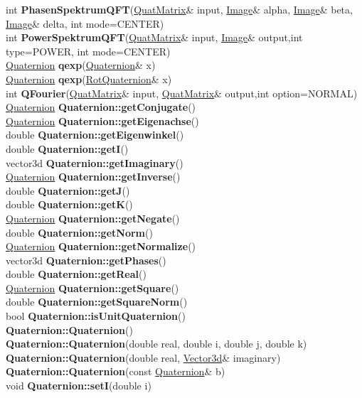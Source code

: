 \documentclass[10pt,titlepage]{article}
\def\functionlistentry#1#2#3#4#5#6{\noindent #1 {\bf #2}(#3) \dotfill #6\\}
\begin{document}
{{\functionlistentry{int}{PhasenSpektrumQFT}{\hyperlink{QuatMatrix}{QuatMatrix}\& input, \hyperlink{Image}{Image}\& alpha, \hyperlink{Image}{Image}\& beta, \hyperlink{Image}{Image}\& delta, int mode=CENTER}{1544}{quaternions}{}
\functionlistentry{int}{PowerSpektrumQFT}{\hyperlink{QuatMatrix}{QuatMatrix}\& input, \hyperlink{Image}{Image}\& output,int type=POWER, int mode=CENTER}{1541}{quaternions}{}
\functionlistentry{\hyperlink{Quaternion}{Quaternion}}{qexp}{\hyperlink{Quaternion}{Quaternion}\& x}{1477}{quaternions}{}
\functionlistentry{\hyperlink{Quaternion}{Quaternion}}{qexp}{\hyperlink{RotQuaternion}{RotQuaternion}\& x}{1501}{quaternions}{}
\functionlistentry{int}{QFourier}{\hyperlink{QuatMatrix}{QuatMatrix}\& input, \hyperlink{QuatMatrix}{QuatMatrix}\& output,int option=NORMAL}{1540}{quaternions}{}
\functionlistentry{\hyperlink{Quaternion}{Quaternion}}{Quaternion::getConjugate}{}{1467}{quaternions}{}
\functionlistentry{\hyperlink{Quaternion}{Quaternion}}{Quaternion::getEigenachse}{}{1474}{quaternions}{}
\functionlistentry{double}{Quaternion::getEigenwinkel}{}{1473}{quaternions}{}
\functionlistentry{double}{Quaternion::getI}{}{1457}{quaternions}{}
\functionlistentry{vector3d}{Quaternion::getImaginary}{}{1460}{quaternions}{}
\functionlistentry{\hyperlink{Quaternion}{Quaternion}}{Quaternion::getInverse}{}{1468}{quaternions}{}
\functionlistentry{double}{Quaternion::getJ}{}{1458}{quaternions}{}
\functionlistentry{double}{Quaternion::getK}{}{1459}{quaternions}{}
\functionlistentry{\hyperlink{Quaternion}{Quaternion}}{Quaternion::getNegate}{}{1466}{quaternions}{}
\functionlistentry{double}{Quaternion::getNorm}{}{1471}{quaternions}{}
\functionlistentry{\hyperlink{Quaternion}{Quaternion}}{Quaternion::getNormalize}{}{1469}{quaternions}{}
\functionlistentry{vector3d}{Quaternion::getPhases}{}{1475}{quaternions}{}
\functionlistentry{double}{Quaternion::getReal}{}{1456}{quaternions}{}
\functionlistentry{\hyperlink{Quaternion}{Quaternion}}{Quaternion::getSquare}{}{1470}{quaternions}{}
\functionlistentry{double}{Quaternion::getSquareNorm}{}{1472}{quaternions}{}
\functionlistentry{bool}{Quaternion::isUnitQuaternion}{}{1476}{quaternions}{}
\functionlistentry{}{Quaternion::Quaternion}{}{1452}{quaternions}{}
\functionlistentry{}{Quaternion::Quaternion}{double real, double i, double j, double k}{1453}{quaternions}{}
\functionlistentry{}{Quaternion::Quaternion}{double real, \hyperlink{Vector3d}{Vector3d}\& imaginary}{1454}{quaternions}{}
\functionlistentry{}{Quaternion::Quaternion}{const \hyperlink{Quaternion}{Quaternion}\& b}{1455}{quaternions}{}
\functionlistentry{void}{Quaternion::setI}{double i}{1462}{quaternions}{}
}}
\end{document}
